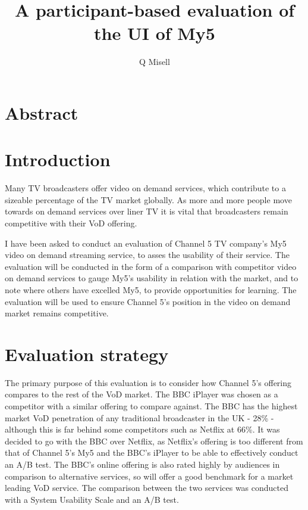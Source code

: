 \documentclass[12pt,a4paper,x11names]{article}
\author{Q Misell}
\title{A participant-based evaluation of the UI of My5}
\begin{document}
\maketitle{}
\tableofcontents{}
\newpage{}

\section{Abstract}

\section{Introduction}
Many TV broadcasters offer video on demand services, which contribute to a sizeable percentage of the TV market globally\cite{ofcom-uk-vod-market}. As more and more people move towards on demand services over liner TV it is vital that broadcasters remain competitive with their VoD offering.

I have been asked to conduct an evaluation of Channel 5 TV company's My5 video on demand streaming service, to asses the usability of their service. The evaluation will be conducted in the form of a comparison with competitor video on demand services to gauge My5's usability in relation with the market, and to note where others have excelled My5, to provide opportunities for learning. The evaluation will be used to ensure Channel 5's position in the video on demand market remains competitive.

\section{Evaluation strategy}
The primary purpose of this evaluation is to consider how Channel 5's offering compares to the rest of the VoD market. The BBC iPlayer was chosen as a competitor with a similar offering to compare against. The BBC has the highest market VoD penetration of any traditional broadcaster in the UK - 28\% - although this is far behind some competitors such as Netflix at 66\%\cite{ofcom-bbc-report}. It was decided to go with the BBC over Netflix, as Netflix's offering is too different from that of Channel 5's My5 and the BBC's iPlayer to be able to effectively conduct an A/B test. The BBC's online offering is also rated highly by audiences in comparison to alternative services\cite{ofcom-bbc-performance}, so will offer a good benchmark for a market leading VoD service. The comparison between the two services was conducted with a System Usability Scale and an A/B test.
\end{document}
